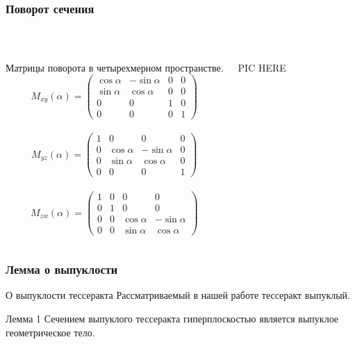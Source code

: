 \documentclass[10pt,pdf,hyperref={unicode}]{beamer}
\begin{document}
\begin{frame}
	\frametitle{Поворот сечения}	\\

	\begin{columns}
	\begin{block}{Матрицы поворота в четырехмерном пространстве.}
		{\footnotesize
			$$
			M_{xy}(\alpha)=
			\left(
			\begin{array}{cccc}
				\cos \alpha & -\sin \alpha & 0 & 0 \\
				\sin \alpha & \cos \alpha & 0 & 0 \\
				0 & 0 & 1 & 0 \\
				0 & 0 & 0 & 1
			\end{array}\right)
			$$			\\
			
			\newline
			$$
			M_{yz}(\alpha)=
			\left(
			\begin{array}{cccc}
				1 & 0 & 0 & 0 \\
				0 & \cos \alpha & -\sin \alpha & 0 \\
				0 & \sin \alpha & \cos \alpha & 0 \\
				0 & 0 & 0 & 1
			\end{array}\right)
			$$			\\ 

			$$
			M_{zw}(\alpha)=
			\left(
			\begin{array}{cccc}
				1 & 0 & 0 & 0 \\
				0 & 1 & 0 & 0 \\
				0 & 0 & \cos \alpha & -\sin \alpha \\
				0 & 0 & \sin \alpha & \cos \alpha
			\end{array}\right)
			$$
		}

\end{block}
PIC HERE
\end{columns}
\end{frame}
\begin{frame}
	\frametitle{Лемма о выпуклости}

	\begin{alertblock}{О выпуклости тессеракта}
		Рассматриваемый в нашей работе тессеракт выпуклый.
	\end{alertblock}

	\begin{block}{Лемма 1}
		Сечением выпуклого тессеракта гиперплоскостью является выпуклое геометрическое тело.
	\end{block}
\end{frame}
\end{document}
